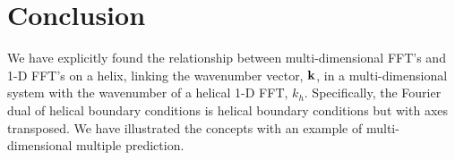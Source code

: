 \section{Conclusion}
We have explicitly found the relationship between multi-dimensional
FFT's and 1-D FFT's on a helix, linking the wavenumber vector, ${\bf
k}$, in a multi-dimensional system with the wavenumber 
of a helical 1-D FFT, $k_h$.  
Specifically, the Fourier dual of helical boundary conditions is
helical boundary conditions but with axes transposed.
We have illustrated the concepts with an example of multi-dimensional
multiple prediction.



